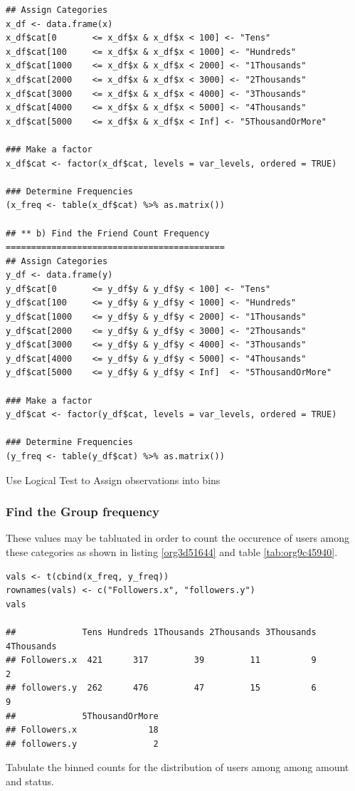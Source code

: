 \documentclass[11pt]{article}
\begin{document}
\begin{listing}[htbp]
\begin{verbatim}
## Assign Categories
x_df <- data.frame(x)
x_df$cat[0       <= x_df$x & x_df$x < 100] <- "Tens"
x_df$cat[100     <= x_df$x & x_df$x < 1000] <- "Hundreds"
x_df$cat[1000    <= x_df$x & x_df$x < 2000] <- "1Thousands"
x_df$cat[2000    <= x_df$x & x_df$x < 3000] <- "2Thousands"
x_df$cat[3000    <= x_df$x & x_df$x < 4000] <- "3Thousands"
x_df$cat[4000    <= x_df$x & x_df$x < 5000] <- "4Thousands"
x_df$cat[5000    <= x_df$x & x_df$x < Inf] <- "5ThousandOrMore"

### Make a factor
x_df$cat <- factor(x_df$cat, levels = var_levels, ordered = TRUE)

### Determine Frequencies
(x_freq <- table(x_df$cat) %>% as.matrix())

## ** b) Find the Friend Count Frequency ===========================================
## Assign Categories
y_df <- data.frame(y)
y_df$cat[0       <= y_df$y & y_df$y < 100] <- "Tens"
y_df$cat[100     <= y_df$y & y_df$y < 1000] <- "Hundreds"
y_df$cat[1000    <= y_df$y & y_df$y < 2000] <- "1Thousands"
y_df$cat[2000    <= y_df$y & y_df$y < 3000] <- "2Thousands"
y_df$cat[3000    <= y_df$y & y_df$y < 4000] <- "3Thousands"
y_df$cat[4000    <= y_df$y & y_df$y < 5000] <- "4Thousands"
y_df$cat[5000    <= y_df$y & y_df$y < Inf]  <- "5ThousandOrMore"

### Make a factor
y_df$cat <- factor(y_df$cat, levels = var_levels, ordered = TRUE)

### Determine Frequencies
(y_freq <- table(y_df$cat) %>% as.matrix())
\end{verbatim}
\caption{\label{orge7aaa1b}Use Logical Test to Assign observations into bins}
\end{listing}

\subsubsection{Find the Group frequency}
\label{sec:orge8b56d4}
These values may be tabluated in order to count the occurence of users among these categories as shown in listing \ref{org3d51644} and table \ref{tab:org9c45940}.

\begin{listing}[htbp]
\begin{verbatim}
vals <- t(cbind(x_freq, y_freq))
rownames(vals) <- c("Followers.x", "followers.y")
vals

##             Tens Hundreds 1Thousands 2Thousands 3Thousands 4Thousands
## Followers.x  421      317         39         11          9          2
## followers.y  262      476         47         15          6          9
##             5ThousandOrMore
## Followers.x              18
## followers.y               2
\end{verbatim}
\caption{\label{org3d51644}Tabulate the binned counts for the distribution of users among among amount and status.}
\end{listing}
\end{document}
